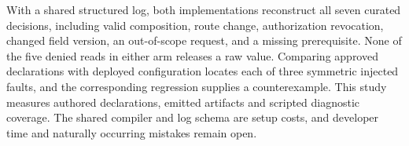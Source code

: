 With a shared structured log, both implementations reconstruct all seven curated decisions, including valid composition, route change, authorization revocation, changed field version, an out-of-scope request, and a missing prerequisite. None of the five denied reads in either arm releases a raw value. Comparing approved declarations with deployed configuration locates each of three symmetric injected faults, and the corresponding regression supplies a counterexample. This study measures authored declarations, emitted artifacts and scripted diagnostic coverage. The shared compiler and log schema are setup costs, and developer time and naturally occurring mistakes remain open.
